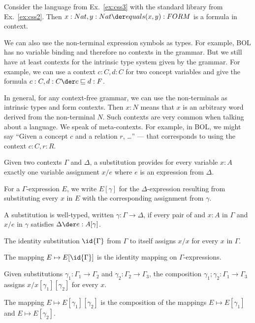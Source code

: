 \begin{example}
Consider the language from Ex.~\ref{ex:css3} with the standard library from Ex.~\ref{ex:css2}.
Then $x:Nat,y:Nat \der equals(x,y):FORM$ is a formula in context.
\end{example}

\begin{example}
We can also use the non-terminal expression symbols as types.
For example, BOL has no variable binding and therefore no contexts in the grammar.
But we still have at least contexts for the intrinsic type system given by the grammar.
For example, we can use a context $c:C,d:C$ for two concept variables and give the formula $c:C,d:C\der c\sqsubseteq d : F$.
\end{example}

In general, for any context-free grammar, we can use the non-terminals as intrinsic types and form contexts.
Then $x:N$ means that $x$ is an arbitrary word derived from the non-terminal $N$.
Such contexts are very common when talking about a language. We speak of meta-contexts.
For example, in BOL, we might say ``Given a concept $c$ and a relation $r$, \ldots'' --- that corresponds to using the context $c:C,r:R$.

\begin{definition}[Substitution]
Given two contexts $\Gamma$ and $\Delta$, a substitution provides for every variable $x:A$ exactly one variable assignment $x/e$ where $e$ is an expression from $\Delta$.

For a $\Gamma$-expression $E$, we write $E[\gamma]$ for the $\Delta$-expression resulting from substituting every $x$ in $E$ with the corresponding assignment from $\gamma$.

A substitution is well-typed, written $\gamma:\Gamma\to \Delta$, if every pair of and $x:A$ in $\Gamma$ and $x/e$ in $\gamma$ satisfies $\Delta\der e:A[\gamma]$.
\end{definition}

\begin{example}[Identity]
The identity substitution $\id{\Gamma}$ from $\Gamma$ to itself assigns $x/x$ for every $x$ in $\Gamma$.

The mapping $E\mapsto E[\id{\Gamma}]$ is the identity mapping on $\Gamma$-expressions.
\end{example}

\begin{example}[Composition]
Given substitutions $\gamma_1:\Gamma_1 \to\Gamma_2$ and $\gamma_2:\Gamma_2\to \Gamma_3$, the composition $\gamma_1;\gamma_2:\Gamma_1\to \Gamma_3$ assigns $x/x[\gamma_1][\gamma_2]$ for every $x$.

The mapping $E\mapsto E[\gamma_1][\gamma_2]$ is the composition of the mappings $E\mapsto E[\gamma_1]$ and $E\mapsto E[\gamma_2]$.
\end{example}

